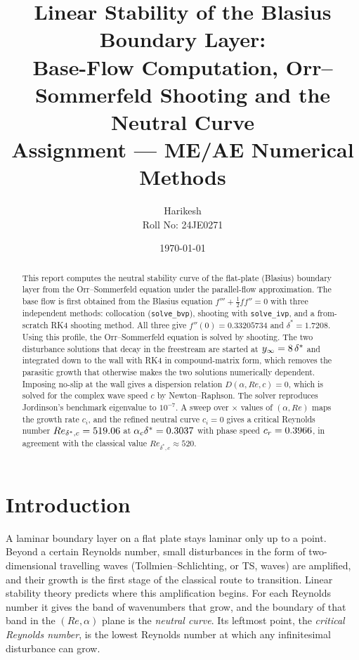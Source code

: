 \documentclass[12pt,a4paper]{article}
\title{\textbf{Linear Stability of the Blasius Boundary Layer:\\ Base-Flow Computation, Orr--Sommerfeld Shooting and the Neutral Curve} \\[0.5em]
\large Assignment --- ME/AE Numerical Methods}
\author{Harikesh \\ Roll No: 24JE0271}
\date{\today}
\begin{document}
\maketitle

\begin{abstract}
This report computes the neutral stability curve of the flat-plate (Blasius) boundary layer from the Orr--Sommerfeld equation under the parallel-flow approximation. The base flow is first obtained from the Blasius equation $f''' + \tfrac12 ff'' = 0$ with three independent methods: collocation (\texttt{solve\_bvp}), shooting with \texttt{solve\_ivp}, and a from-scratch RK4 shooting method. All three give $f''(0) = 0.33205734$ and $\delta^* = 1.7208$. Using this profile, the Orr--Sommerfeld equation is solved by shooting. The two disturbance solutions that decay in the freestream are started at $y_\infty = 8\,\delta^*$ and integrated down to the wall with RK4 in compound-matrix form, which removes the parasitic growth that otherwise makes the two solutions numerically dependent. Imposing no-slip at the wall gives a dispersion relation $D(\alpha, Re, c) = 0$, which is solved for the complex wave speed $c$ by Newton--Raphson. The solver reproduces Jordinson's benchmark eigenvalue to $10^{-7}$. A sweep over \osNAlpha$\times$\osNRe{} values of $(\alpha, Re)$ maps the growth rate $c_i$, and the refined neutral curve $c_i = 0$ gives a critical Reynolds number $Re_{\delta^*,c} = 519.06$ at $\alpha_c\delta^* = 0.3037$ with phase speed $c_r = 0.3966$, in agreement with the classical value $Re_{\delta^*,c} \approx 520$.
\end{abstract}

\tableofcontents
\newpage

\section{Introduction}

A laminar boundary layer on a flat plate stays laminar only up to a point. Beyond a certain Reynolds number, small disturbances in the form of two-dimensional travelling waves (Tollmien--Schlichting, or TS, waves) are amplified, and their growth is the first stage of the classical route to transition. Linear stability theory predicts where this amplification begins. For each Reynolds number it gives the band of wavenumbers that grow, and the boundary of that band in the $(Re, \alpha)$ plane is the \emph{neutral curve}. Its leftmost point, the \emph{critical Reynolds number}, is the lowest Reynolds number at which any infinitesimal disturbance can grow.
\end{document}
